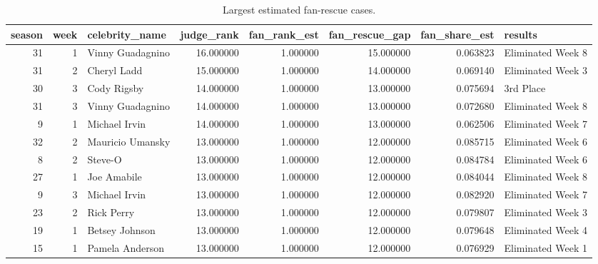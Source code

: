 \begin{table}
\caption{Largest estimated fan-rescue cases.}
\begin{tabular}{rrlrrrrl}
\toprule
season & week & celebrity\_name & judge\_rank & fan\_rank\_est & fan\_rescue\_gap & fan\_share\_est & results \\
\midrule
31 & 1 & Vinny Guadagnino & 16.000000 & 1.000000 & 15.000000 & 0.063823 & Eliminated Week 8 \\
31 & 2 & Cheryl Ladd & 15.000000 & 1.000000 & 14.000000 & 0.069140 & Eliminated Week 3 \\
30 & 3 & Cody Rigsby & 14.000000 & 1.000000 & 13.000000 & 0.075694 & 3rd Place \\
31 & 3 & Vinny Guadagnino & 14.000000 & 1.000000 & 13.000000 & 0.072680 & Eliminated Week 8 \\
9 & 1 & Michael Irvin & 14.000000 & 1.000000 & 13.000000 & 0.062506 & Eliminated Week 7 \\
32 & 2 & Mauricio Umansky & 13.000000 & 1.000000 & 12.000000 & 0.085715 & Eliminated Week 6 \\
8 & 2 & Steve-O & 13.000000 & 1.000000 & 12.000000 & 0.084784 & Eliminated Week 6 \\
27 & 1 & Joe Amabile & 13.000000 & 1.000000 & 12.000000 & 0.084044 & Eliminated Week 8 \\
9 & 3 & Michael Irvin & 13.000000 & 1.000000 & 12.000000 & 0.082920 & Eliminated Week 7 \\
23 & 2 & Rick Perry & 13.000000 & 1.000000 & 12.000000 & 0.079807 & Eliminated Week 3 \\
19 & 1 & Betsey Johnson & 13.000000 & 1.000000 & 12.000000 & 0.079648 & Eliminated Week 4 \\
15 & 1 & Pamela Anderson & 13.000000 & 1.000000 & 12.000000 & 0.076929 & Eliminated Week 1 \\
\bottomrule
\end{tabular}
\end{table}
